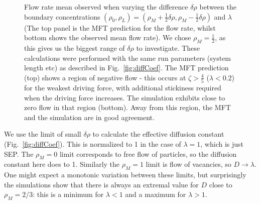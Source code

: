 \documentclass[
reprint, amsmath,amssymb,
]{revtex4-1}
\begin{document}
\begin{figure}[h!]
\begin{center}
\begin{tabular}{c}
    \end{tabular}
\end{center}
    \vspace{0em}
\caption{\label{fig:constDens} Flow rate mean observed when varying the difference $\delta\rho$ between the boundary concentrations
$(\rho_0, \rho_L) = (\rho_M + \frac{1}{2} \delta\rho, \rho_M - \frac{1}{2} \delta\rho)$ and $\lambda$ (The top panel is the MFT prediction
for the flow rate, whilst bottom shows the observed mean flow rate).
We chose $\rho_M=\frac{1}{2}$, as this gives us the biggest range of $\delta\rho$ to investigate.
These calculations were performed with the same run parameters (system length etc) as described in Fig.~\ref{fig:diffCoef}.
The MFT prediction (top) shows a region of
negative flow - this occurs at $\zeta > \frac{4}{5}$ ($\lambda < 0.2$) for the weakest
driving force, with additional stickiness required when the driving
force increases. The simulation exhibits close to zero flow in that
region (bottom).  Away from this region, the MFT and
the simulation are in good agreement.
}
\end{figure}
We use the limit of small $\delta\rho$ to calculate the effective
diffusion constant (Fig.~\ref{fig:diffCoef}).  This is normalized to 1 in the case of
$\lambda=1$, which is just SEP.  The $\rho_M=0$ limit corresponds to
free flow of particles, so the diffusion constant here does to
1. Similarly the $\rho_M=1$ limit is flow of vacancies, so
$D\rightarrow\lambda$.  One might expect a monotonic variation between
these limits, but surprisingly the simulations show that there is
always an extremal value for $D$ close to $\rho_M=2/3$: this is a
minimum for $\lambda<1$ and a maximum for $\lambda>1$.
\end{document}
